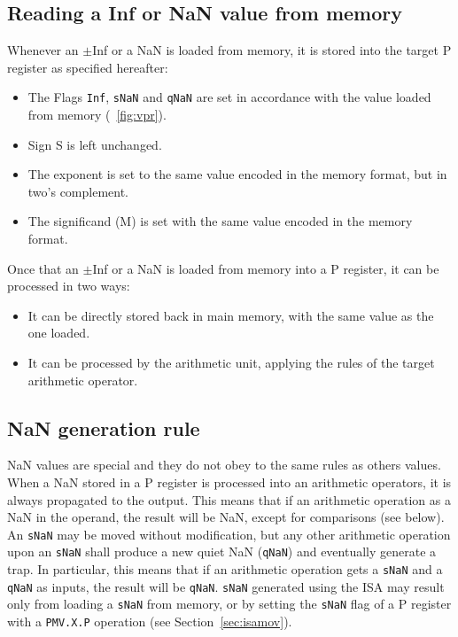 \subsection{ Reading a Inf or NaN value from memory}

\label{sec:nanmem}

Whenever an $\pm$Inf or a NaN is loaded from memory, it is stored into the target P register as specified hereafter:
\begin{itemize}[topsep=0pt]
    \item The Flags \texttt{Inf}, \texttt{sNaN} and \texttt{qNaN} are set in accordance with the value loaded from memory (\figurename~\ref{fig:vpr}).
    \item Sign S is left unchanged.
    \item The exponent is set to the same value encoded in the memory format, but in two's complement.
    \item The significand (M) is set with the same value encoded in the memory format.
\end{itemize}

Once that an $\pm$Inf or a NaN is loaded from memory into a P register, it can be processed in two ways:
\begin{itemize}[topsep=0pt]
    \item It can be directly stored back in main memory, with the same value as the one loaded.
    \item It can be processed by the arithmetic unit, applying the rules of the target arithmetic operator.
\end{itemize}

\subsection{NaN generation rule}

\label{sec:nangen}

NaN values are special and they do not obey to the same rules as others values.
When a NaN stored in a P register is processed into an arithmetic operators, it is always propagated to the output.
This means that if an arithmetic operation as a NaN in the operand, the result will be NaN, except for comparisons (see below).
An \texttt{sNaN} may be moved without modification, but any other arithmetic operation upon an \texttt{sNaN} shall produce a new quiet NaN (\texttt{qNaN}) and eventually generate a trap.
In particular, this means that if an arithmetic operation gets a \texttt{sNaN} and a \texttt{qNaN} as inputs, the result will be \texttt{qNaN}.
\texttt{sNaN}  generated using the ISA may result only from loading a \texttt{sNaN} from memory, or by setting the \texttt{sNaN} flag of a P register with a \texttt{PMV.X.P} operation (see Section~\ref{sec:isamov}).

